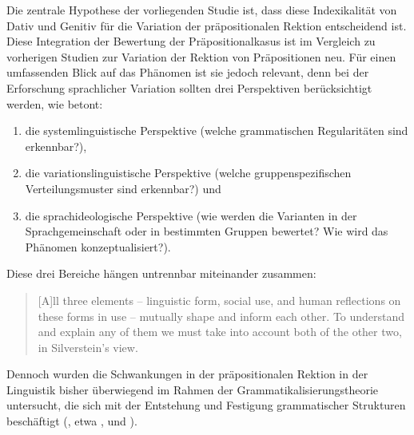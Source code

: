 Die zentrale Hypothese der vorliegenden Studie ist, dass diese Indexikalität von Dativ und Genitiv für die Variation %
der präpositionalen Rektion entscheidend ist. 
Diese Integration der Bewertung der Präpositionalkasus ist im Vergleich zu vorherigen Studien zur Variation der Rektion von Präpositionen neu.
Für einen umfassenden Blick auf das Phänomen ist sie jedoch relevant, denn bei der Erforschung sprachlicher Variation sollten drei Perspektiven berücksichtigt werden, wie \citet[223]{Silverstein.1985} betont: 
\begin{enumerate}
\sloppy
\item die systemlinguistische Perspektive (welche grammatischen Regularit{\"a}ten sind erkennbar?), 
\item die variationslinguistische Perspektive (welche gruppenspezifischen Verteilungsmuster sind erkennbar?) und 
\item die sprachideologische Perspektive (wie werden die Varianten in der Sprachgemeinschaft oder in bestimmten Gruppen bewertet? Wie wird das Ph{\"a}nomen konzeptualisiert?).
\end{enumerate} 
Diese drei Bereiche hängen untrennbar miteinander zusammen: 
\begin{quote}[A]ll three elements -- linguistic form, social use, and human reflections on these forms in use -- mutually shape and inform each other. To understand and explain any of them we must take into account both of the other two, in Silverstein's view.~\citep[436]{Woolard2008}\end{quote}
Dennoch wurden die Schwankungen in der präpositionalen Rektion in der Linguistik bisher überwiegend im Rahmen der Grammatikalisierungstheorie untersucht, die sich mit der Entstehung und Festigung grammatischer Strukturen beschäftigt (\citeauthor[s. vor allem die Arbeiten von][]{DiMeola2000}, etwa \citeyear{DiMeola2000}, \citeyear{DiMeola2003} und \citeyear{DiMeola2006}). 
